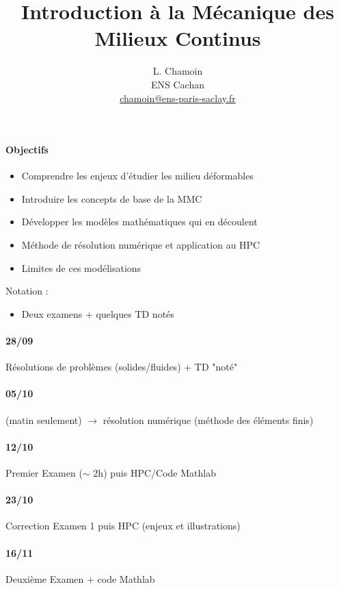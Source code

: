 \documentclass{article}
\title{Introduction à la Mécanique des Milieux Continus}
\author{L. Chamoin\\
ENS Cachan\\
\url{chamoin@ens-paris-saclay.fr}}
\date{}
\begin{document}
\maketitle
\tableofcontents
\newpage

\paragraph{Objectifs}
\begin{itemize}
\item Comprendre les enjeux d'étudier les milieu déformables
\item Introduire les concepts de base de la MMC
\item Développer les modèles mathématiques qui en découlent
\item Méthode de résolution numérique et application au HPC
\item Limites de ces modélisations
\end{itemize}
\bigskip

Notation :
\begin{itemize}
\item Deux examens + quelques TD notés
\end{itemize}

\paragraph{28/09} Résolutions de problèmes (solides/fluides) + TD "noté"

\paragraph{05/10} (matin seulement) $\to$ résolution numérique (méthode des éléments finis)

\paragraph{12/10} Premier Examen ($\sim$ 2h) puis HPC/Code Mathlab

\paragraph{23/10} Correction Examen 1 puis HPC (enjeux et illustrations)

\paragraph{16/11} Deuxième Examen + code Mathlab
\end{document}
